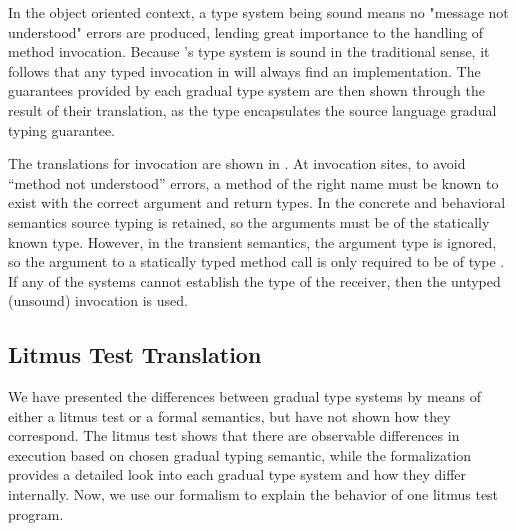 \documentclass[USenglish]{tex/lipics-v2016}
\begin{document}
In the object oriented context, a type system being sound means no
"message not understood" errors are produced, lending great importance to the
handling of method invocation. Because \kafka's type system is sound in the
traditional sense, it follows that any typed invocation in \kafka will always
find an implementation. The guarantees provided by each gradual type system are
then shown through the result of their translation, as the \kafka type encapsulates
the source language gradual typing guarantee.


The translations for invocation are shown in . At
invocation sites, to avoid ``method not understood'' errors, a method of the
right name must be known to exist with the correct argument and return types.
In the concrete and behavioral semantics source typing is retained, so the
arguments must be of the statically known type. However, in the transient
semantics, the argument type is ignored, so the argument to a statically typed
method call is only required to be of type \any. If any of the systems cannot
establish the type of the receiver, then the untyped (unsound) invocation is
used.

\subsection{Litmus Test Translation}

We have presented the differences between gradual type systems by means of
either a litmus test or a formal semantics, but have not shown how they
correspond. The litmus test shows that there are observable differences in
execution based on chosen gradual typing semantic, while the formalization
provides a detailed look into each gradual type system and how they differ
internally. Now, we use our formalism to explain the behavior of one litmus
test program.
\end{document}
